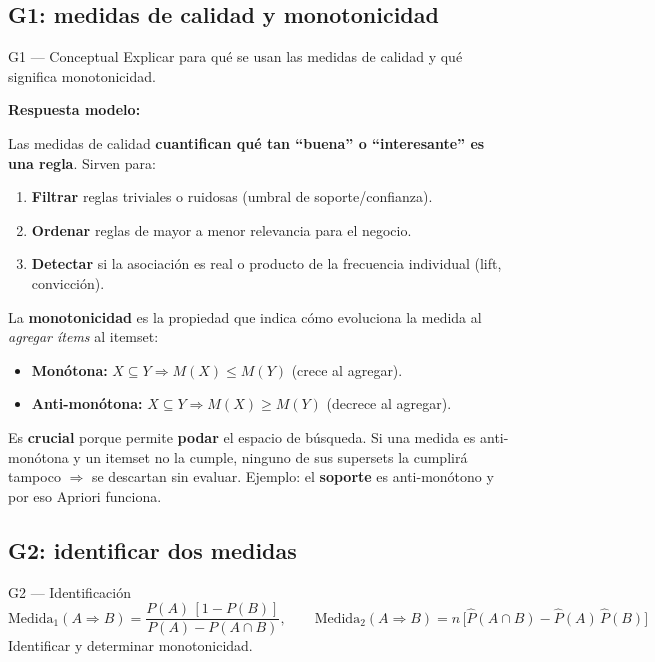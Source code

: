 \documentclass[11pt,a4paper]{article}
\begin{document}
\subsection{G1: medidas de calidad y monotonicidad}

\begin{ejerciciobox}{G1 — Conceptual}
Explicar para qué se usan las medidas de calidad y qué significa monotonicidad.
\end{ejerciciobox}

\textbf{Respuesta modelo:}

Las medidas de calidad \textbf{cuantifican qué tan ``buena'' o ``interesante'' es una regla}.
Sirven para:
\begin{enumerate}
    \item \textbf{Filtrar} reglas triviales o ruidosas (umbral de soporte/confianza).
    \item \textbf{Ordenar} reglas de mayor a menor relevancia para el negocio.
    \item \textbf{Detectar} si la asociación es real o producto de la frecuencia individual
          (lift, convicción).
\end{enumerate}

La \textbf{monotonicidad} es la propiedad que indica cómo evoluciona la medida al
\emph{agregar ítems} al itemset:
\begin{itemize}
    \item \textbf{Monótona:} $X \subseteq Y \Rightarrow M(X) \le M(Y)$ (crece al agregar).
    \item \textbf{Anti-monótona:} $X \subseteq Y \Rightarrow M(X) \ge M(Y)$ (decrece al agregar).
\end{itemize}

Es \textbf{crucial} porque permite \textbf{podar} el espacio de búsqueda. Si una medida es
anti-monótona y un itemset no la cumple, ninguno de sus supersets la cumplirá tampoco
$\Rightarrow$ se descartan sin evaluar. Ejemplo: el \textbf{soporte} es anti-monótono y por
eso Apriori funciona.

\subsection{G2: identificar dos medidas}

\begin{ejerciciobox}{G2 — Identificación}
\[
\text{Medida}_1(A \Rightarrow B) = \frac{P(A)\,[1 - P(B)]}{P(A) - P(A \cap B)},\qquad
\text{Medida}_2(A \Rightarrow B) = n\,\bigl[\hat{P}(A \cap B) - \hat{P}(A)\,\hat{P}(B)\bigr]
\]
Identificar y determinar monotonicidad.
\end{ejerciciobox}
\end{document}
